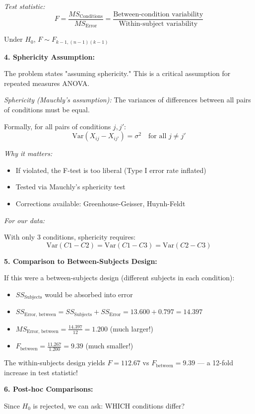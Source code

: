 \documentclass[12pt]{article}
\begin{document}
\begin{explanation}
\textit{Test statistic:}
\[
F = \frac{MS_{\text{Conditions}}}{MS_{\text{Error}}} = \frac{\text{Between-condition variability}}{\text{Within-subject variability}}
\]

Under $H_0$, $F \sim F_{k-1, (n-1)(k-1)}$

\textbf{4. Sphericity Assumption:}

The problem states "assuming sphericity." This is a critical assumption for repeated measures ANOVA.

\textit{Sphericity (Mauchly's assumption):} The variances of differences between all pairs of conditions must be equal.

Formally, for all pairs of conditions $j, j'$:
\[
\text{Var}(X_{ij} - X_{ij'}) = \sigma^2 \quad \text{for all } j \neq j'
\]

\textit{Why it matters:}
\begin{itemize}
\item If violated, the F-test is too liberal (Type I error rate inflated)
\item Tested via Mauchly's sphericity test
\item Corrections available: Greenhouse-Geisser, Huynh-Feldt
\end{itemize}

\textit{For our data:}

With only 3 conditions, sphericity requires:
\[
\text{Var}(C1 - C2) = \text{Var}(C1 - C3) = \text{Var}(C2 - C3)
\]

\textbf{5. Comparison to Between-Subjects Design:}

If this were a between-subjects design (different subjects in each condition):

\begin{itemize}
\item $SS_{\text{Subjects}}$ would be absorbed into error
\item $SS_{\text{Error, between}} = SS_{\text{Subjects}} + SS_{\text{Error}} = 13.600 + 0.797 = 14.397$
\item $MS_{\text{Error, between}} = \frac{14.397}{12} = 1.200$ (much larger!)
\item $F_{\text{between}} = \frac{11.267}{1.200} = 9.39$ (much smaller!)
\end{itemize}

The within-subjects design yields $F = 112.67$ vs $F_{\text{between}} = 9.39$ — a 12-fold increase in test statistic!

\textbf{6. Post-hoc Comparisons:}

Since $H_0$ is rejected, we can ask: WHICH conditions differ?


\end{explanation}
\end{document}
